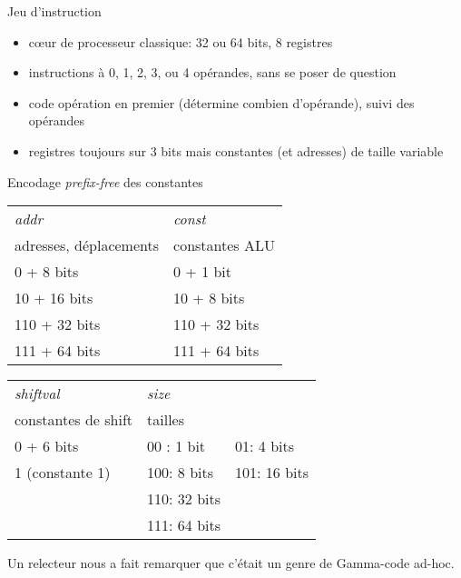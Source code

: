 \documentclass[slidetop,11pt,table]{beamer}
\begin{document}
\begin{frame}{Jeu d'instruction}
  \begin{itemize}
  \item cœur de processeur classique: 32 ou 64 bits, 8 registres
  \item instructions à 0, 1, 2, 3, ou 4 opérandes, sans se poser de question
  \item code opération en premier (détermine combien d'opérande), suivi des opérandes
  \item registres toujours sur 3 bits mais constantes (et adresses) de taille variable
  \end{itemize}
\end{frame}

\begin{frame}{Encodage \emph{prefix-free} des constantes}

  \begin{center}
    \begin{tabular}{|l||l|}
      \hline
      \emph{addr}&  \emph{const}  \\
      adresses, déplacements & constantes ALU    \\
      \hline
      0 + 8 bits               & 0 + 1 bit      \\ 
      10 + 16 bits             & 10 + 8 bits    \\
      110 + 32 bits            & 110 + 32 bits  \\
      111 + 64 bits            & 111 + 64 bits   \\
      \hline
    \end{tabular}
    
    \begin{tabular}{|l||ll|}
      \hline
      \emph{shiftval} & \emph{size}& \\
      constantes de shift & tailles     &              \\
      
      0 + 6 bits          & 00 : 1 bit &  01: 4 bits  \\ 
      1  (constante 1)    & 100: 8 bits& 101: 16 bits \\
                      & 110: 32 bits &            \\
                      & 111: 64 bits &             \\
      \hline
    \end{tabular}
  \end{center}
  Un relecteur nous a fait remarquer que c'était un genre de Gamma-code ad-hoc.
\end{frame}
\end{document}
